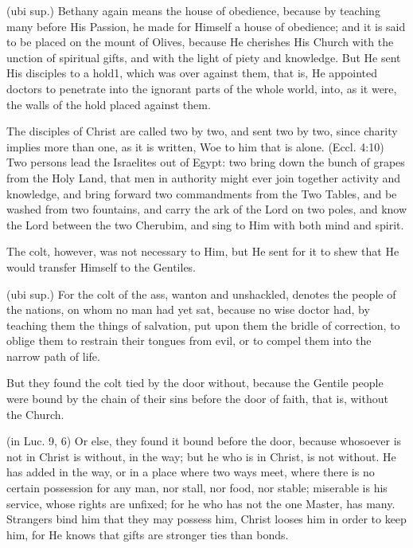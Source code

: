  (ubi sup.) Bethany again means the house of obedience, because by teaching many before His Passion, he made for Himself a house of obedience; and it is said to be placed on the mount of Olives, because He cherishes His Church with the unction of spiritual gifts, and with the light of piety and knowledge. But He sent His disciples to a hold1, which was over against them, that is, He appointed doctors to penetrate into the ignorant parts of the whole world, into, as it were, the walls of the hold placed against them.

 The disciples of Christ are called two by two, and sent two by two, since charity implies more than one, as it is written, Woe to him that is alone. (Eccl. 4:10) Two persons lead the Israelites out of Egypt: two bring down the bunch of grapes from the Holy Land, that men in authority might ever join together activity and knowledge, and bring forward two commandments from the Two Tables, and be washed from two fountains, and carry the ark of the Lord on two poles, and know the Lord between the two Cherubim, and sing to Him with both mind and spirit.

 The colt, however, was not necessary to Him, but He sent for it to shew that He would transfer Himself to the Gentiles.

 (ubi sup.) For the colt of the ass, wanton and unshackled, denotes the people of the nations, on whom no man had yet sat, because no wise doctor had, by teaching them the things of salvation, put upon them the bridle of correction, to oblige them to restrain their tongues from evil, or to compel them into the narrow path of life.

 But they found the colt tied by the door without, because the Gentile people were bound by the chain of their sins before the door of faith, that is, without the Church.

 (in Luc. 9, 6) Or else, they found it bound before the door, because whosoever is not in Christ is without, in the way; but he who is in Christ, is not without. He has added in the way, or in a place where two ways meet, where there is no certain possession for any man, nor stall, nor food, nor stable; miserable is his service, whose rights are unfixed; for he who has not the one Master, has many. Strangers bind him that they may possess him, Christ looses him in order to keep him, for He knows that gifts are stronger ties than bonds.

